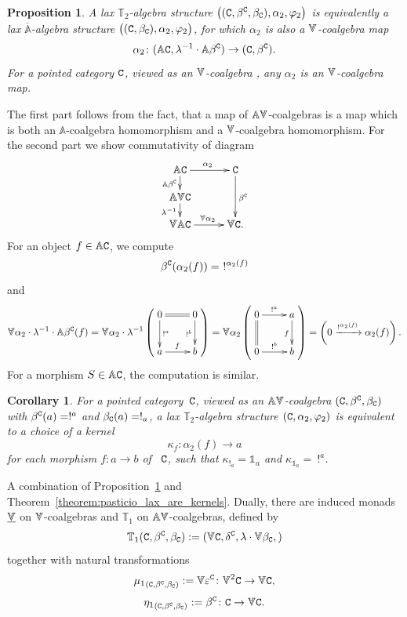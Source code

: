 \documentclass[12pt,leqno]{amsart}
\newtheorem{corollary}[theorem]{Corollary}
\newtheorem{proposition}[theorem]{Proposition}
\theoremstyle{definition}
\def\T{\mathbb{T}}
\def\Ar{\mathbb{A}}
\def\id{{\mathbb 1}}
\newcommand{\C}{{\tt C}}
\newcommand{\eK}{\alpha_2}%
\newcommand{\4}{\texttt{4}}
\newcommand{\oAr}{\overline{\Ar}}
\newcommand{\Vr}{\text{\raisebox{\depth}{\scalebox{1}[-1]{$\Ar$}}}}
\newcommand{\uVr}{\underline{\text{\raisebox{\depth}{\scalebox{1}[-1]{$\Ar$}}}}}
\renewcommand{\epsilon}{\varepsilon}
\renewcommand{\phi}{\varphi}
\let\pf\proof
\let\epf\endproof
\begin{document}
\begin{proposition}   
\label{krasny zapad slunce z 19 patra}
A lax $\T_2$-algebra structure
$\big((\C,\beta^\C,\beta_\C),\alpha_2,\phi_2\big)$ is equivalently a
lax $\oAr$-algebra structure
$\big((\C,\beta_\C),\alpha_2,\phi_2\big)$, for which $\eK$ is also a
$\Vr$-coalgebra map
$$\alpha_2\colon (\Ar\C,\lambda^{-1}\cdot
\Ar\beta^\C)\to(\C,\beta^\C).$$ For a pointed category $\C$, viewed as
an
$\Vr$-coalgebra%
, any $\alpha_2$ is an \/$\Vr$-coalgebra map.
\end{proposition}
\pf The first part follows from the fact, that a map of $\Ar\Vr$-coalgebras is a map which is both an $\Ar$-coalgebra homomorphism and a $\Vr$-coalgebra homomorphism. For the second part we show commutativity of diagram
\begin{equation}
\xymatrix@C=2.7em@R=1.2em{
\Ar \C \ar[r]^{\alpha_2} \ar[d]_{\Ar\beta^\C}   
&  \C \ar[dd]^{\beta^\C}   
\\
\Ar\Vr\C
\ar[d]_{\lambda^{-1}} 
\\
\Vr\Ar\C   \ar[r]^{\Vr\alpha_2}    &\Vr\C.
}
\end{equation}
For an object $f\in \Ar\C$, we compute 
\[
\beta^\C(\alpha_2(f))=\ !^{\alpha_2(f)}
\]
and
\[\Vr\alpha_2\cdot\lambda^{-1}\cdot\Ar\beta^\C(f)=\Vr\alpha_2\cdot\lambda^{-1}\left(
\raisebox{2em}{\xymatrix{
	0 \ar[d]^{!^a}\ar@{=}[r]& 0 \ar[d]_{!^b}
\\
	a \ar[r]^{f}& b
}}
\right)=\Vr\alpha_2\left(
\raisebox{2em}{\xymatrix{
	0 \ar[r]^{!^a}\ar@{=}[d]& a \ar[d]_{f}
\\
	0 \ar[r]^{!^b}& b
}}
\right)=\left(0\xrightarrow{!^{\alpha_2(f)}}\alpha_2(f)\right).\]
For a morphism $S\in \Ar\C$, the computation is similar.\epf
\begin{corollary}
\label{corollary:T_2_kernels}
For a pointed category \,$\C$, viewed as an $\Ar\Vr$-coalgebra
$(\C,\beta^\C,\beta_\C)$ with $\beta^\C(a)=!^a$ and $\beta_\C(a)=!_a$,
a lax $\T_2$-algebra structure $(\C,\eK,\phi_2)$ is equivalent to a
choice of a kernel
\[
\kappa_f\colon \eK (f)\to a
\]
for each morphism $f\colon a \to b$ of \ $\C$, such that
$\kappa_{!_a}=\id_a$ and $\kappa_{\id_a}=\ !^a$.
\end{corollary}

\pf
A combination of Proposition~\ref{krasny zapad slunce z 19 patra} and Theorem~\ref{theorem:pasticio_lax_are_kernels}. \epf 
Dually, there are induced monads $\uVr$ on $\Vr$-coalgebras and $\T_1$ on $\Ar\Vr$-coalgebras, defined by
$$\T_1(\C,\beta^\C,\beta_\C):=(\Vr\C, \delta^\C,\lambda\cdot \Vr\beta_\C,)$$
    together with natural transformations 
    $${\mu_1}_{(\C,\beta^\C,\beta_\C)}:=\Vr\epsilon^\C\colon \Vr^2 \C \to \Vr\C,$$
$${\eta_1}_{(\C,\beta^\C,\beta_\C)}:=\beta^\C\colon \C\to \Vr\C.$$
\end{document}

